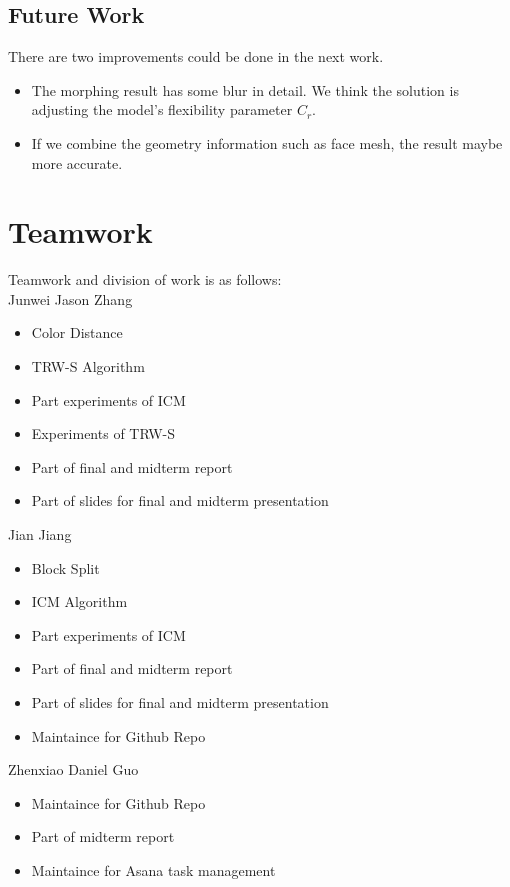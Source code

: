 \documentclass{article} %
\begin{document}
\subsection{Future Work}
	There are two improvements could be done in the next work.
	\begin{itemize}
	  \item
	  The morphing result has some blur in detail. We think the solution is adjusting the model's flexibility parameter $C_{r}$.
	  \item
	  If we combine the geometry information such as face mesh, the result maybe more accurate.
	\end{itemize}

\section{Teamwork}
Teamwork and division of work is as follows:\\
Junwei Jason Zhang
\begin{itemize}
	\item Color Distance
	\item TRW-S Algorithm
	\item Part experiments of ICM
	\item Experiments of TRW-S
	\item Part of final and midterm report
	\item Part of slides for final and midterm presentation
\end{itemize}
Jian Jiang
\begin{itemize}
	\item Block Split
	\item ICM Algorithm
	\item Part experiments of ICM
	\item Part of final and midterm report
	\item Part of slides for final and midterm presentation
	\item Maintaince for Github Repo
\end{itemize}
Zhenxiao Daniel Guo
\begin{itemize}
	\item Maintaince for Github Repo
	\item Part of midterm report
	\item Maintaince for Asana task management
\end{itemize}
        

\end{document}
